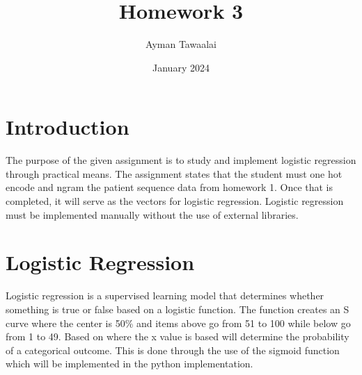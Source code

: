 \documentclass{article}
\title{Homework 3}
\author{Ayman Tawaalai }
\date{January 2024}
\begin{document}
\maketitle

\section{Introduction}
The purpose of the given assignment is to study and implement logistic regression through practical means. The assignment states that the student must one hot encode and ngram the patient sequence data from homework 1. Once that is completed, it will serve as the vectors for logistic regression. Logistic regression must be implemented manually without the use of external libraries.

\section{Logistic Regression}
Logistic regression is a supervised learning model that determines whether something is true or false based on a logistic function. The function creates an S curve where the center is 50\% and items above go from 51 to 100 while below go from 1 to 49. Based on where the x value is based will determine the probability of a categorical outcome. This is done through the use of the sigmoid function which will be implemented in the python implementation.
\end{document}
